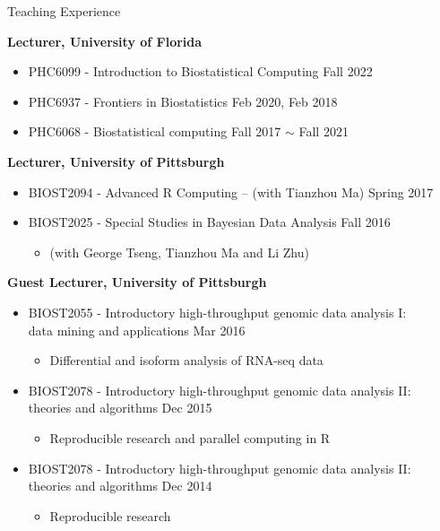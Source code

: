 \documentclass{resume} %
\begin{document}
\begin{rSection}{Teaching Experience }

\textbf{Lecturer, University of Florida}
\begin{itemize}[noitemsep,topsep=0pt]
\item PHC6099 - Introduction to Biostatistical Computing	 \hfill Fall 2022
\item PHC6937 - Frontiers in Biostatistics \hfill Feb 2020, Feb 2018
\item PHC6068 - Biostatistical computing \hfill Fall 2017 $\sim$ Fall 2021
\end{itemize}


\textbf{Lecturer, University of Pittsburgh}
\begin{itemize}[noitemsep,topsep=0pt]
\item BIOST2094 - Advanced R Computing -- (with Tianzhou Ma) \hfill Spring 2017
\item BIOST2025 - Special Studies in Bayesian Data Analysis  \hfill Fall 2016
\begin{itemize}[noitemsep,topsep=0pt]
\item{(with George Tseng, Tianzhou Ma and Li Zhu)}
\end{itemize}
\end{itemize}


\textbf{Guest Lecturer, University of Pittsburgh}
\begin{itemize}[noitemsep,topsep=0pt]
\item BIOST2055 - Introductory high-throughput genomic data analysis I: \\data mining and applications \hfill Mar 2016
\begin{itemize}[noitemsep,topsep=0pt]
\item{Differential and isoform analysis of RNA-seq data}
\end{itemize}
\item BIOST2078 - Introductory high-throughput genomic data analysis II: \\theories and algorithms  \hfill Dec 2015
\begin{itemize}[noitemsep,topsep=0pt]
\item{Reproducible research and parallel computing in R}
\end{itemize}
\item BIOST2078 - Introductory high-throughput genomic data analysis II: \\theories and algorithms  \hfill Dec 2014
\begin{itemize}[noitemsep,topsep=0pt]
\item{Reproducible research}
\end{itemize}
\end{itemize}


\end{rSection}
\end{document}
